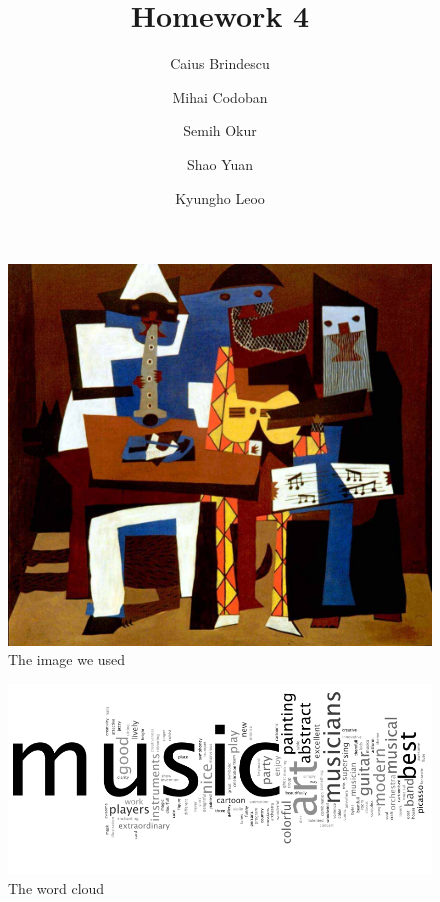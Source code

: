 \documentclass{article}
\title{Homework 4}
\author{Caius Brindescu \and Mihai Codoban \and Semih Okur \and Shao Yuan \and Kyungho Leoo}
\begin{document}
\maketitle

\begin{figure}
	\begin{center}
		\includegraphics{image.jpg}
	\end{center}
	\caption{The image we used}
	\label{fig:image}
\end{figure}

\begin{figure}
	\includegraphics[width=\textwidth]{wordcloud.png}
	\caption{The word cloud}
	\label{fig:cloud}
\end{figure}
\end{document}

